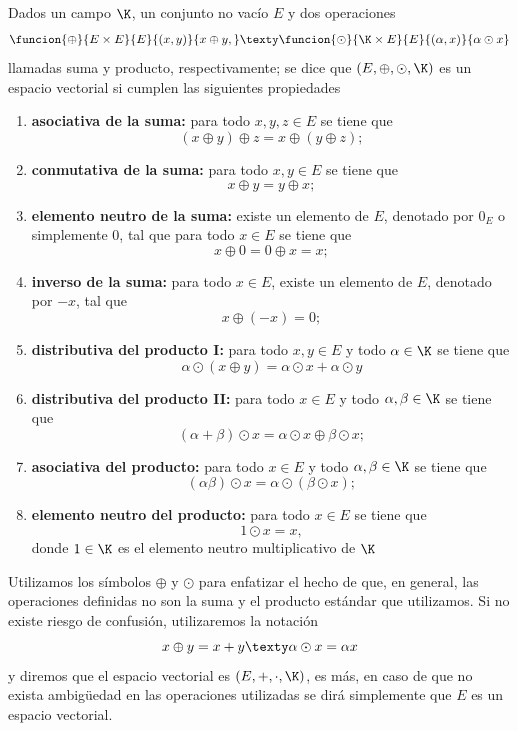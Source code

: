 \documentclass[a4,11pt]{aleph-notas}
\begin{document}
\begin{defi}
    Dados un campo $\K$, un conjunto no vacío $E$ y dos operaciones
    \[
        \funcion{\oplus}{E\times E}{E}{(x,y)}{x\oplus y,}
        \texty
        \funcion{\odot}{\K\times E}{E}{(\alpha,x)}{\alpha\odot x}
    \]
    llamadas suma y producto, respectivamente; se dice que $(E,\oplus,\odot,\K)$ es un espacio vectorial si cumplen las siguientes propiedades
    \begin{enumerate}
    \item \textbf{asociativa de la suma:}
        para todo $x,y,z\in E$ se tiene que
        \[
            (x \oplus y) \oplus z = x \oplus (y \oplus z);
        \]
    \item \textbf{conmutativa de la suma:}
        para todo $x,y\in E$ se tiene que
        \[
            x \oplus y = y \oplus x;
        \]
    \item \textbf{elemento neutro de la suma:}
        existe un elemento de $E$, denotado por $0_E$ o simplemente $0$, tal que para todo $x\in E$ se tiene que 
        \[
            x \oplus 0 = 0 \oplus x = x;
        \]
    \item \textbf{inverso de la suma:}
        para todo $x\in E$, existe un elemento de $E$, denotado por $-x$, tal que
        \[
            x \oplus (-x)= 0;
        \]
    \item \textbf{distributiva del producto I:}
        para todo $x,y\in E$ y todo $\alpha\in \K$ se tiene que
        \[
            \alpha\odot (x \oplus y)=\alpha\odot x + \alpha\odot y
        \]
    \item \textbf{distributiva del producto II:}
        para todo $x\in E$ y todo $\alpha,\beta\in \K$ se tiene que
        \[
            (\alpha+\beta)\odot x=\alpha\odot x \oplus \beta\odot x;
        \]
    \item \textbf{asociativa del producto:}
        para todo $x\in E$ y todo $\alpha,\beta\in \K$ se tiene que
        \[
            (\alpha\beta)\odot x=\alpha\odot(\beta\odot x);
        \]
    \item \textbf{elemento neutro del producto:}
        para todo $x\in E$ se tiene que
        \[
            1\odot x=x,
        \]
        donde $1\in\K$ es el elemento neutro multiplicativo de $\K$
    \end{enumerate}
\end{defi}

\begin{advertencia}
    Utilizamos los símbolos $\oplus$ y $\odot$ para enfatizar el hecho de que, en general, las operaciones definidas no son la suma y el producto estándar que utilizamos. Si no existe riesgo de confusión, utilizaremos la notación
    \[
        x\oplus y = x+y
        \texty
        \alpha \odot x = \alpha x
    \]
    y diremos que el espacio vectorial es $(E,+,\cdot,\K)$, es más, en caso de que no exista ambigüedad en las operaciones utilizadas se dirá simplemente que $E$ es un espacio vectorial.
\end{advertencia}
\end{document}
